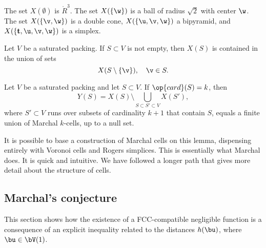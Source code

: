The set $X(\emptyset)$ is $\ring{R}^3$.  The set $X(\{\w\})$ is a ball
of radius $\sqrt2$ with center $\w$.  The set $X(\{\v,\w\})$ is a
double cone, $X(\{\u,\v,\w\})$ a bipyramid, and $X(\{{\mathbf
  t},\u,\v,\w\})$ is a simplex.

\begin{lemma}
Let $V$ be a saturated packing.
If $S\subset V$ is not empty, then $X(S)$ is contained in the union of sets
\[
X(S\setminus \{\v\}),  \quad \v\in S.
\]
\end{lemma}

\begin{lemma}
Let $V$ be a saturated packing and let $S\subset V$. 
 If $\op{card}(S)=k$, then
\[Y(S) = X(S) \setminus \bigcup_{S\subset S'\subset V} X(S'),\]
where $S'\subset V$ runs over subsets of cardinality $k+1$ that contain $S$,
equals a finite union of Marchal $k$-cells, up to a null set.
\end{lemma}

It is possible to base a construction of Marchal cells on this lemma,
dispensing entirely with Voronoi cells and Rogers simplices.  This is
essentially what Marchal does.  It is quick and intuitive.  We have
followed a longer path that gives more detail about the structure of
cells.



\subsection{Marchal's conjecture}

This section shows how the existence of a FCC-compatible negligible
function is a consequence of an explicit
inequality related to the distances $h(\bu)$, where $\bu\in \bV(1)$.



